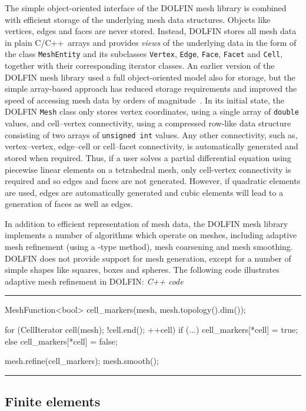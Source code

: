 \documentclass[acmtoms]{acmtrans2m}
\newenvironment{cppcode}[1]{\center\minipage{#1\textwidth}\footnotesize\hfill\it C++ code \rm\vspace{0.1cm}\hrule\renewcommand{\baselinestretch}{0.9}\footnotesize\verbatim}{\endverbatim\hrule\normalsize\endminipage\newline\endcenter}
\newcommand{\emp}[1]{\texttt{#1}}
\newcommand{\dolfin}{DOLFIN}
\begin{document}
The simple object-oriented interface of the \dolfin{} mesh library is
combined with efficient storage of the underlying mesh data
structures. Objects like vertices, edges and faces are never
stored. Instead, \dolfin{} stores all mesh data in plain C/C++~arrays
and provides \emph{views} of the underlying data in the form of the
class \emp{MeshEntity} and its subclasses \emp{Vertex}, \emp{Edge},
\emp{Face}, \emp{Facet} and \emp{Cell}, together with their
corresponding iterator classes. An earlier version of the \dolfin{}
mesh library used a full object-oriented model also for storage, but the
simple array-based approach has reduced storage requirements and improved the
speed of accessing mesh data by orders of magnitude~\cite{logg:2008}.
In its initial state, the \dolfin{} \emp{Mesh} class only stores
vertex coordinates, using a single array of \emp{double} values, and
cell--vertex connectivity, using a compressed row-like data structure
consisting
of two arrays of \emp{unsigned~int} values. Any other connectivity,
such as, vertex--vertex, edge--cell or cell--facet connectivity,
is automatically generated and stored when required.
Thus, if a user solves a partial differential equation using
piecewise linear elements on a tetrahedral mesh, only cell-vertex
connectivity is required and so edges and faces are not
generated. However, if quadratic elements are used, edges are
automatically generated and cubic elements will lead to a generation
of faces as well as edges.

In addition to efficient representation of mesh data, the \dolfin{}
mesh library implements a number of algorithms which operate on
meshes, including adaptive mesh refinement
(using a -type method), mesh coarsening and mesh
smoothing.
\dolfin{} does not provide
support for mesh generation, except for a number of simple shapes like
squares, boxes and spheres. The following code illustrates adaptive
mesh refinement in \dolfin{}:
\begin{cppcode}{0.9}
MeshFunction<bool> cell_markers(mesh, mesh.topology().dim());

for (CellIterator cell(mesh); !cell.end(); ++cell)
{
  if (...)
    cell_markers[*cell] = true;
  else
    cell_markers[*cell] = false;
}

mesh.refine(cell_markers);
mesh.smooth();
\end{cppcode}

\subsection{Finite elements}
\end{document}
